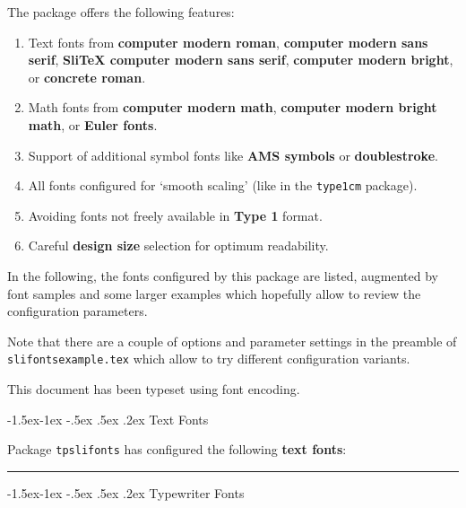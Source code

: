 \documentclass[letterpaper,landscape,KOMA,smallheadings,calcdimensions,display]{powersem}
\makeatletter
\renewcommand\section{\@startsection{section}{1}{\z@}%
  {-1.5ex\@plus -1ex \@minus -.5ex}%
  {.5ex \@plus .2ex}%
  {\raggedsection\normalfont\size@section\sectfont}}
\renewcommand\section{\@startsection{section}{1}{\z@}%
  {-1.5ex\@plus -1ex \@minus -.5ex}%
  {.5ex \@plus .2ex}%
  {\normalfont\large\sffamily\bfseries}}
\let\code\texttt
\let\concept\textbf
\newenvironment{slide}{\raggedright}{}
\makeatother
\begin{document}
\begin{slide}
The package offers the following features:
\begin{enumerate}
\item Text fonts from \concept{computer modern roman}, \concept{computer modern sans serif}, \concept{Sli\TeX{} computer
    modern sans serif}, \concept{computer modern bright}, or \concept{concrete roman}.
\item Math fonts from \concept{computer modern math}, \concept{computer modern bright math}, or \concept{Euler fonts}.
\item Support of additional symbol fonts like \concept{AMS symbols} or \concept{doublestroke}.
\item All fonts configured for `smooth scaling' (like in the \code{type1cm} package).
\item Avoiding fonts not freely available in \concept{Type 1} format.
\item Careful \concept{design size} selection for optimum readability.
\end{enumerate}

\newpage

In the following, the fonts configured by this package are listed, augmented by font samples and some larger examples
which hopefully allow to review the configuration parameters.

Note that there are a couple of options and parameter settings in the preamble of \code{slifontsexample.tex} which allow
to try different configuration variants.

This document has been typeset using \encodingdefault{} font encoding.

\section{Text Fonts}

Package \code{tpslifonts} has configured the following \concept{text fonts}:

\renewcommand{\mkdescription}[2]
{%

  \medskip\pagebreak[3]

  \hrule
  
  #1:\\ #2{The quick brown fox jumps over the lazy dog.}

}%

\medskip

\hrule

\medskip

\section{Typewriter Fonts}


\end{slide}
\end{document}
